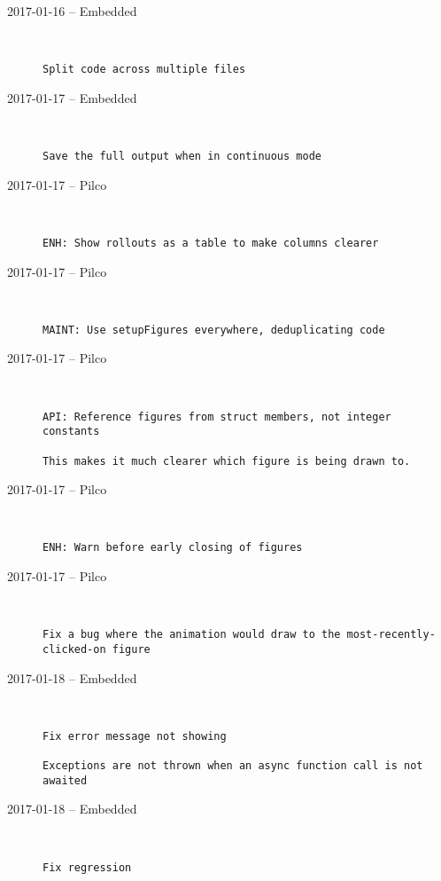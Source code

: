 \begin{description}
  \item[2017-01-16 -- Embedded] \hfill \
\begin{lstlisting}
Split code across multiple files
\end{lstlisting}


  \item[2017-01-17 -- Embedded] \hfill \
\begin{lstlisting}
Save the full output when in continuous mode
\end{lstlisting}


  \item[2017-01-17 -- Pilco] \hfill \
\begin{lstlisting}
ENH: Show rollouts as a table to make columns clearer
\end{lstlisting}


  \item[2017-01-17 -- Pilco] \hfill \
\begin{lstlisting}
MAINT: Use setupFigures everywhere, deduplicating code
\end{lstlisting}


  \item[2017-01-17 -- Pilco] \hfill \
\begin{lstlisting}
API: Reference figures from struct members, not integer constants

This makes it much clearer which figure is being drawn to.
\end{lstlisting}


  \item[2017-01-17 -- Pilco] \hfill \
\begin{lstlisting}
ENH: Warn before early closing of figures
\end{lstlisting}


  \item[2017-01-17 -- Pilco] \hfill \
\begin{lstlisting}
Fix a bug where the animation would draw to the most-recently-clicked-on figure
\end{lstlisting}


  \item[2017-01-18 -- Embedded] \hfill \
\begin{lstlisting}
Fix error message not showing

Exceptions are not thrown when an async function call is not awaited
\end{lstlisting}


  \item[2017-01-18 -- Embedded] \hfill \
\begin{lstlisting}
Fix regression
\end{lstlisting}



\end{description}
